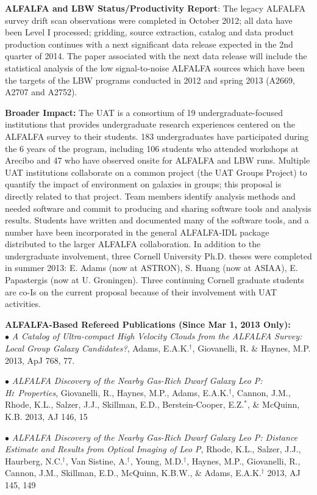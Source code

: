 \documentclass[11pt]{article}
\newcommand{\HI}{H\textsc{i}}
\begin{document}
{\bf ALFALFA and LBW Status/Productivity Report}:\hskip 5pt
The legacy ALFALFA survey drift scan observations were completed in October 2012; all
data have been Level I processed; gridding, source extraction, catalog and data product
production continues
with a next significant data release expected in the 2nd quarter of 2014. The paper associated with the
next data release will include the statistical analysis of the low signal-to-noise ALFALFA
sources which have been the targets of the LBW programs conducted in 2012 and spring 2013
(A2669, A2707 and A2752).

{\bf Broader Impact:}\hskip 5pt The UAT is a consortium of
19 undergraduate-focused institutions that provides undergraduate research
experiences centered on the ALFALFA survey to their students. 183 undergraduates have
participated during the 6 years of the program, including 106 students who
attended workshops at Arecibo and 47 who have observed onsite for ALFALFA
and LBW runs. Multiple UAT institutions
collaborate on a common project (the UAT Groups Project) to quantify the impact of environment
on galaxies in groups; this proposal is directly related to that project. Team members
identify analysis methods and needed software and commit
to producing and sharing software tools and analysis results.
Students have written and documented many of the software tools, and a number
have been incorporated in the general ALFALFA-IDL package distributed to the larger
ALFALFA collaboration. In addition to the undergraduate involvement,
three Cornell University Ph.D. theses were completed in summer 2013: E. Adams (now at ASTRON),
S. Huang (now at ASIAA), E. Papastergis (now at U. Groningen). Three continuing Cornell
graduate students are co-Is on the current proposal because of their involvement with
UAT activities.


{\bf ALFALFA-Based Refereed Publications (Since Mar 1, 2013 Only):}\\
\parskip 0pt
\parindent 0pt
$\bullet$ \hskip 3pt {\it A Catalog of Ultra-compact High Velocity Clouds from the ALFALFA Survey: Local Group Galaxy Candidates?},
Adams, E.A.K.$^\dagger$, Giovanelli, R. \& Haynes, M.P. 2013, ApJ 768, 77.

$\bullet$ \hskip 3pt {\it ALFALFA Discovery of the Nearby Gas-Rich Dwarf Galaxy Leo P: \HI\ Properties},
Giovanelli, R., Haynes, M.P., Adams, E.A.K.$^\dagger$, Cannon, J.M., Rhode, K.L.,
Salzer, J.J., Skillman, E.D., Berstein-Cooper, E.Z.$^*$, \& McQuinn, K.B. 2013, AJ 146, 15

$\bullet$ \hskip 3pt {\it ALFALFA Discovery of the Nearby Gas-Rich Dwarf Galaxy Leo P:
Distance Estimate and Results from Optical Imaging of Leo P},
Rhode, K.L., Salzer, J.J., Haurberg, N.C.$^\dagger$,
Van Sistine, A.$^\dagger$, Young, M.D.$^\dagger$, Haynes, M.P., Giovanelli, R.,
Cannon, J.M., Skillman, E.D., McQuinn, K.B.W., \& Adams, E.A.K.$^\dagger$ 2013, AJ 145, 149
\end{document}
